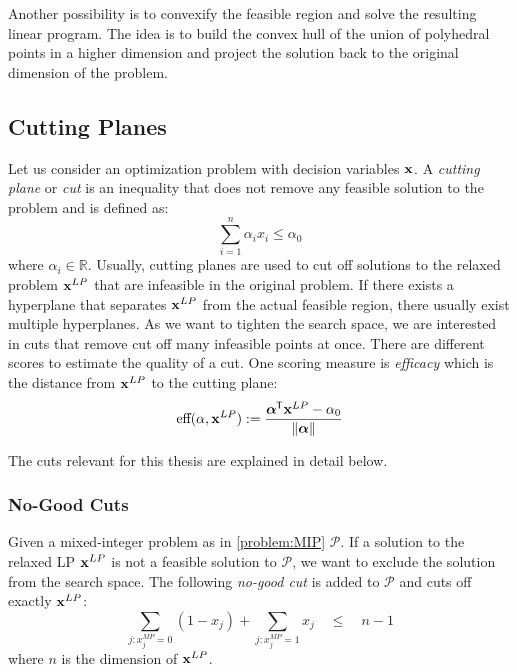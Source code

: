 Another possibility is to convexify the feasible region and solve the resulting linear program. The idea is to build the convex hull of the union of polyhedral points in a higher dimension and project the solution back to the original dimension of the problem. 


\subsection{Cutting Planes} \label{Section:cuts}
Let us consider an optimization problem with decision variables $\bold x$. A \textit{cutting plane} or \textit{cut} is an inequality that does not remove any feasible solution to the problem and is defined as: 
\begin{equation} \label{Eq:cuts}
    \sum_{i=1}^n \alpha_i x_i \leq \alpha_0
\end{equation} 
where $\alpha_i \in \mathbb{R}$. Usually, cutting planes are used to cut off solutions to the relaxed problem $\bold x^{LP}$ that are infeasible in the original problem. If there exists a hyperplane that separates $\bold x^{LP}$ from the actual feasible region, there usually exist multiple hyperplanes. As we want to tighten the search space, we are interested in cuts that remove cut off many infeasible points at once. There are different scores to estimate the quality of a cut. One scoring measure is \textit{efficacy} which is the distance from $\bold x^{LP}$ to the cutting plane:
\begin{equation}
    \text{eff}(\bold \alpha, \bold x^{LP}) := \frac{\boldsymbol \alpha ^{\mkern-1.5mu\mathsf{T}} \bold x^{LP} - \alpha_0}{\lVert \boldsymbol \alpha \rVert}
\end{equation}

\cite{turner_adaptive_2023}

The cuts relevant for this thesis are explained in detail below. 

\subsubsection{No-Good Cuts}
Given a mixed-integer problem as in \cref{problem:MIP} $\mathcal{P}$. If a solution to the relaxed LP $\bold x^{LP}$ is not a feasible solution to $\mathcal{P}$, we want to exclude the solution from the search space. The following \textit{no-good cut} is added to $\mathcal{P}$ and cuts off exactly $\bold x^{LP}$:
\begin{equation*}
    \sum_{j: x_j^{MP}=0} (1 - x_{j}) + \sum_{j: x_j^{MP}=1} x_j \quad \leq \quad n -1
\end{equation*}
where $n$ is the dimension of $\bold x^{LP}$. 

